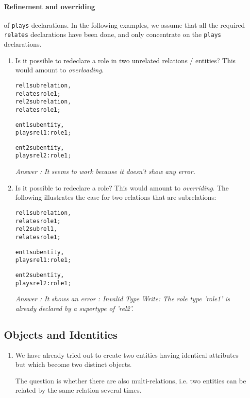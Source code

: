 \documentclass[runningheads]{llncs}
\begin{document}
\paragraph{Refinement and overriding} of \texttt{plays} declarations. In the
following examples, we assume that all the required \texttt{relates}
declarations have been done, and only concentrate on the \texttt{plays}
declarations.

\begin{enumerate}
\item Is it possible to redeclare a role in two unrelated relations /
  entities? This would amount to \emph{overloading}.

  \begin{alltt}
rel1 sub relation,
     relates role1;
rel2 sub relation,
     relates role1;

ent1 sub entity,
  plays rel1:role1;

ent2 sub entity,
  plays rel2:role1;
  \end{alltt}
  
 
\emph{Answer : It seems to work because it doesn't show any error. }
 
\item Is it possible to redeclare a role? This would amount to
  \emph{overriding}. The following illustrates the case for two relations that
  are subrelations:
  
  \begin{alltt}
rel1 sub relation,
     relates role1;
rel2 sub rel1,
     relates role1;

ent1 sub entity,
  plays rel1:role1;

ent2 sub entity,
  plays rel2:role1;
  \end{alltt}

\emph{Answer : It shows an error : Invalid Type Write: The role type 'role1' is already declared by a supertype of 'rel2'. }
  

\end{enumerate}


\subsection{Objects and Identities}

\begin{enumerate}
\item We have already tried out to create two entities having identical
  attributes but which become two distinct objects.

  The question is whether there are also multi-relations, i.e. two entities
  can be related by the same relation several times.
\end{enumerate}
\end{document}
